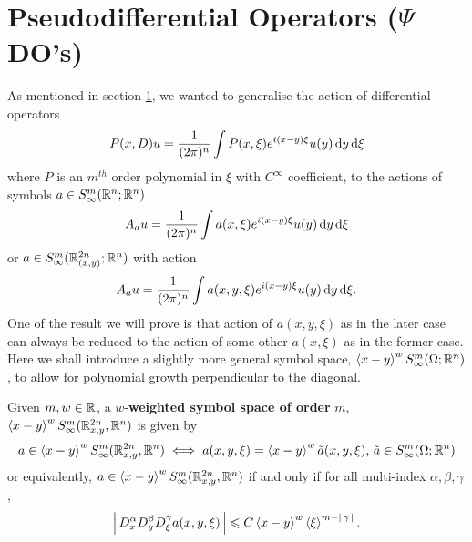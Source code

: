 \documentclass{article}
\begin{document}
\section{Pseudodifferential Operators ($\Psi$DO's)}
As mentioned in section \ref{}, we wanted to generalise the action of differential operators 
\begin{align*}
P(x, D) u = \frac{1}{(2\pi)^n} \int P(x, \xi) e^{i (x - y)\xi} u(y) \d[y] \d[\xi]
\end{align*}
where $P$ is an $m^{th}$ order polynomial in $\xi$ with $C^\infty$ coefficient, to the actions of symbols $a \in S^{m}_\infty(\R^n; \R^n)$
\begin{align*}
A_a u = \frac{1}{(2\pi)^n} \int a(x, \xi) e^{i (x - y)\xi} u(y) \d[y] \d[\xi]
\end{align*}
or $a \in S^{m}_\infty(\R^{2n}_{(x, y)}; \R^n)$ with action 
\begin{align*}
A_a u = \frac{1}{(2\pi)^n} \int a(x, y, \xi) e^{i (x - y)\xi} u(y) \d[y] \d[\xi]. 
\end{align*}
One of the result we will prove is that action of $a(x, y, \xi)$ as in the later case can always be reduced to the action of some other $a(x, \xi)$ as in the former case. \\


Here we shall introduce a slightly more general symbol space, $\sym[x-y]^w S^{m}_\infty(\Omega; \R^n)$, to allow for polynomial growth perpendicular to the diagonal. 
\begin{fdefinition}
    Given $m, w \in \R$, a $w$-\textbf{weighted symbol space of order} $m$, $\sym[x - y]^w S^{m}_\infty(\R^{2n}_{x,y}, \R^n) $ is given by 
    \begin{align*}
    a \in \sym[x - y]^w S^{m}_\infty(\R^{2n}_{x,y}, \R^n) \iff a(x, y, \xi) = \sym[x - y]^w \tilde{a}(x, y, \xi), \, \tilde{a} \in S^{m}_\infty(\Omega; \R^n)
    \end{align*}
    or equivalently, $a \in \sym[x - y]^w S^{m}_\infty(\R^{2n}_{x,y}, \R^n) $ if and only if for all multi-index $\alpha, \beta, \gamma$, 
    \begin{align*}
    \abs{D^\alpha_x D^\beta_yD^\gamma_\xi a(x, y, \xi)} \leq C \sym[x - y]^w \sym[\xi]^{m - \abs{\gamma}}. 
    \end{align*}
\end{fdefinition}
\end{document}
